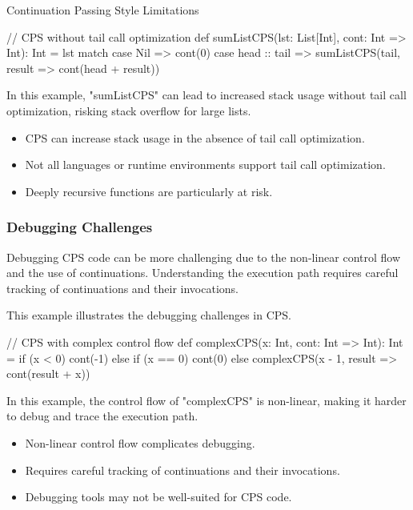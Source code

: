 \begin{notes}{Continuation Passing Style Limitations}
\begin{highlight}
    \begin{code}[Scala]
    // CPS without tail call optimization
    def sumListCPS(lst: List[Int], cont: Int => Int): Int =
        lst match {
            case Nil => cont(0)
            case head :: tail => sumListCPS(tail, result => cont(head + result))
        }
    \end{code}
    
        In this example, "sumListCPS" can lead to increased stack usage without tail call optimization, risking stack overflow for large lists.
    
        \begin{itemize}
            \item CPS can increase stack usage in the absence of tail call optimization.
            \item Not all languages or runtime environments support tail call optimization.
            \item Deeply recursive functions are particularly at risk.
        \end{itemize}
    
    \end{highlight}
    
    \subsubsection*{Debugging Challenges}
    
    Debugging CPS code can be more challenging due to the non-linear control flow and the use of continuations. Understanding the execution path requires careful tracking of continuations and their invocations.
    
    \begin{highlight}
    
        This example illustrates the debugging challenges in CPS.
    
    \begin{code}[Scala]
    // CPS with complex control flow
    def complexCPS(x: Int, cont: Int => Int): Int =
        if (x < 0) cont(-1)
        else if (x == 0) cont(0)
        else complexCPS(x - 1, result => cont(result + x))
    \end{code}
    
        In this example, the control flow of "complexCPS" is non-linear, making it harder to debug and trace the execution path.
    
        \begin{itemize}
            \item Non-linear control flow complicates debugging.
            \item Requires careful tracking of continuations and their invocations.
            \item Debugging tools may not be well-suited for CPS code.
        \end{itemize}
    

\end{highlight}
\end{notes}
